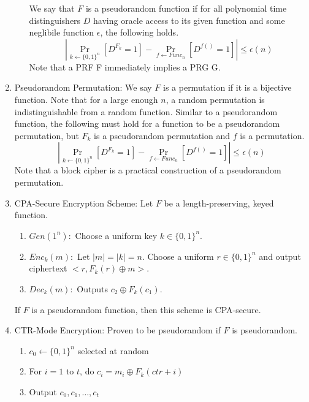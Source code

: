 \documentclass[12pt,letterpaper]{article}
\begin{document}
\begin{enumerate}
\begin{enumerate}
        We say that $F$ is a pseudorandom function if for all polynomial time distinguishers $D$ having oracle access to its given function and some neglibile function $\epsilon$, the following holds.
        \[\left|\Pr_{k\leftarrow\{0,1\}^n}[D^{F_k}=1]-\Pr_{f\leftarrow Func_n}[D^{f()}=1]\right|\leq\epsilon(n)\]
        Note that a PRF F immediately implies a PRG G.
        \end{enumerate}
    \item Pseudorandom Permutation: We say $F$ is a permutation if it is a bijective function. Note that for a large enough $n$, a random permutation is indistinguishable from a random function. Similar to a pseudorandom function, the following must hold for a function to be a pseudorandom permutation, but $F_k$ is a pseudorandom permutation and $f$ is a permutation.
        \[\left|\Pr_{k\leftarrow\{0,1\}^n}[D^{F_k}=1]-\Pr_{f\leftarrow Func_n}[D^{f()}=1]\right|\leq\epsilon(n)\]
        Note that a block cipher is a practical construction of a pseudorandom permutation.
    \item CPA-Secure Encryption Scheme: Let $F$ be a length-preserving, keyed function.
        \begin{enumerate}
            \item $Gen(1^n):$ Choose a uniform key $k\in\{0,1\}^n$.
            \item $Enc_k(m):$ Let $|m|=|k|=n$. Choose a uniform $r\in\{0,1\}^n$ and output ciphertext $<r,F_k(r)\oplus m>$.
            \item $Dec_k(m):$ Outputs $c_2\oplus F_k(c_1)$.
        \end{enumerate}
        If $F$ is a pseudorandom function, then this scheme is CPA-secure.\newpage
    \item CTR-Mode Encryption: Proven to be pseudorandom if $F$ is pseudorandom.
        \begin{enumerate}
            \item $c_0\leftarrow\{0,1\}^n$ selected at random
            \item For $i=1$ to $t$, do $c_i=m_i\oplus F_k(ctr+i)$
            \item Output $c_0,c_1,\ldots,c_t$
        \end{enumerate}


\end{enumerate}
\end{document}
